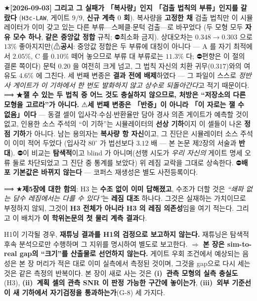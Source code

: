 \documentclass[11pt]{report}
\numberwithin{equation}{chapter}
\numberwithin{figure}{chapter}
\numberwithin{table}{chapter}
\begin{document}
★\textbf{[2026-09-03] 그리고 그 실패가 「복사량」인지 「검출 법칙의 부류」인지를 갈랐다}
(\texttt{H3c-LAW}, 게이트 $9/9$, \textbf{신규 계측 $0$ 회}). 복사량을 \textbf{고정한 채}
검출 법칙만 이 시뮬레이터가 이미 갖고 있는 다른 부류---스페클$\cdot$문턱 검출---로 바꾸었다
(두 모형 모두 \textbf{자유 모수 하나}, \textbf{같은 중앙값 정합} 규칙; ⛔최소화 금지).
상대오차는 $0.348 \to 0.303$ 으로 \textbf{$13\%$} 좋아지지만(⚠\textbf{공시}: 중앙값 정합은
두 부류에 대칭이 아니다 --- A 를 자기 최적에서 $2.05\%$, C 를 $0.10\%$ 떼어 놓으므로
부류 대 부류로는 $11.3\%$ 다; ⛔편향은 이 절의 결론 쪽이다) 문턱 $0.20$ 을 여전히 크게
넘고, 그 법칙 자신의 치환 귀무($0.317$)와의 여유도 $4.6\%$ 에 그친다. 세 번째 변종은
\textbf{결과 전에 배제}하였다 --- 그 파일이 스스로 \emph{정반사 게이트가 이 기하에서 한 번도
발화하지 않고 상수로 되돌아간다}고 적기 때문이다.
⟹ ★\textbf{잴 수 있는 두 법칙 중 어느 것도 충실하지 않으므로, 처방은 ``저장소의 다른
모형을 고르라''가 아니다.} ⚠\textbf{세 번째 변종은 「반증」이 아니라 「이 자로는 잴 수
없음」이다} --- 동결 셀이 입사각$\cdot$수심$\cdot$반환율만 담아 경사 의존 게이트가 예측할
것이 없고, 인용한 소스 주석의 ``이 기하''는 시뮬레이터의 \textbf{선상 기하}이지 이 셀들이
나온 \textbf{정점 기하}가 아니다.
남는 용의자는 \textbf{복사량 항 자신}이고, 그 진단은 시뮬레이터 소스 주석이 이미 적어 두었다
(입사각 $80^\circ$ 가 법선보다 $3.12$ 배 --- 본 논문 제2장의 서술과 \textbf{반대}).
⛔이 비교는 \textbf{탐색적}이고 blind 가 아니며(선행 시도가 \emph{우리 자신의} 게이트 명세
오류 둘로 차단되었고 그 진단 중 통계를 보았다) 위 레짐 교락을 그대로 상속한다.
⛔\textbf{배포 기본값은 바뀌지 않는다} --- 코퍼스 재생성은 별도 사전등록이다.

⟹ ★\textbf{제5장에 대한 함의}: H3 는 \textbf{수조 없이 이미 답해졌고}, 수조가 더할 것은
\emph{``쇄파 없는 담수 레짐에서는 다를 수 있다''}는 \textbf{레짐 대조} 하나다.
그것은 실재하는 가치이므로 부정하지 않되, 그것이 \textbf{H3 전체가 아니라 H3 의 레짐
의존성}임을 여기 적는다. 그리고 이 배치가 \textbf{이 학위논문의 첫 물리 계측 결과}다.

H1이 기각될 경우, \textbf{재튜닝 결과를 H1의 검정으로 보고하지 않는다.}
재튜닝은 탐색적 후속 분석으로만 수행하며 그 지위를 명시하여 별도로 보고한다.
$\Rightarrow$ \textbf{본 장은 sim-to-real gap의 ``크기''를 산출물로 선언하지 않는다.}
게이트 우회 조건에서 예상되는 음성은 본 장 머리가 적은 대로 이미 실측에서 측정된 것이며,
그것을 gap으로 다시 세는 것은 같은 측정의 반복이다.
본 장이 새로 사는 것은 \textbf{(i)~관측 모형의 실측 충실도}(H3),
\textbf{(ii)~계획 셀의 관측 SNR 이 판정 가능한 구간에 놓이는가},
\textbf{(iii)~외부 기준선이 새 기하에서 자기검정을 통과하는가}(G-8) 세 가지다.
\end{document}
